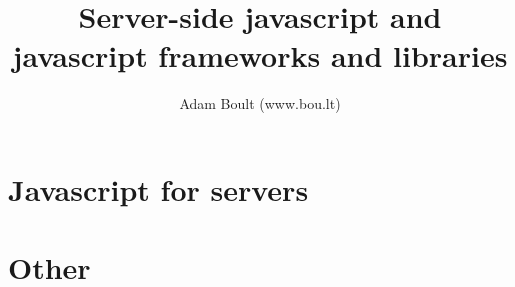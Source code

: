 \documentclass[oneside]{book}
\begin{document}
\author{Adam Boult (www.bou.lt)}
\title{Server-side javascript and javascript frameworks and libraries}
\maketitle

\setcounter{tocdepth}{0}
\tableofcontents



\part{Javascript for servers}







\part{Other}

\end{document}
